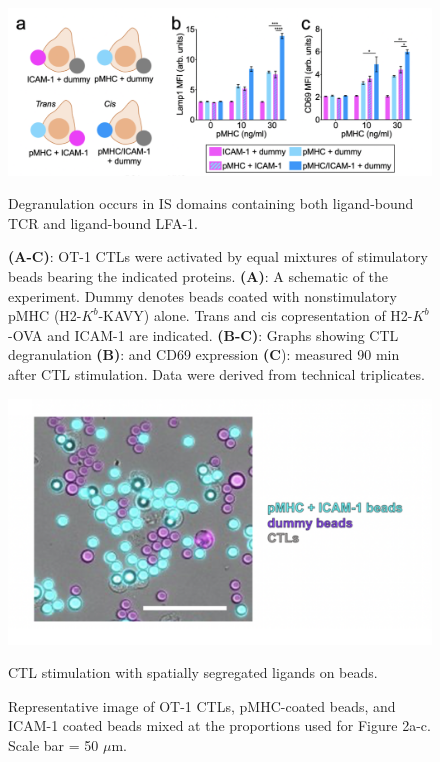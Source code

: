 \begin{figure}[htbp]
	\centering
	\includegraphics[width=0.9\columnwidth]{../figures/chapter3/fig2twobeads.png}
	\caption{Degranulation occurs in IS domains containing both ligand-bound TCR and ligand-bound LFA-1.}
	\caption*{\textbf{(A-C)}: OT-1 CTLs were activated by equal mixtures of stimulatory beads bearing the indicated proteins. \textbf{(A)}: A schematic of the experiment. Dummy denotes beads coated with nonstimulatory pMHC (H2-$K^{b}$-KAVY) alone. Trans and cis copresentation of H2-$K^{b}$-OVA and ICAM-1 are indicated. \textbf{(B-C)}: Graphs showing CTL degranulation \textbf{(B)}: and CD69 expression \textbf{(C}): measured 90 min after CTL stimulation. Data were derived from technical triplicates.}
	\label{fig:fig2twobeads}
\end{figure}

\begin{figure}[htbp]
	\centering
	\includegraphics[width=0.9\columnwidth]{../figures/chapter3/fig2twobeadsimaging.png}
	\caption{CTL stimulation with spatially segregated ligands on beads.}
	\caption*{Representative image of OT-1 CTLs, pMHC-coated beads, and ICAM-1 coated beads mixed at the proportions used for Figure 2a-c. Scale bar = 50 $\mu$m.}
	\label{fig:fig2twobeadsimaging}
\end{figure}

